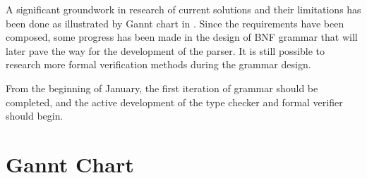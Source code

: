 \documentclass[oneside]{ecsproject}     %
\begin{document}
A significant groundwork in research of current solutions and their limitations has been done as illustrated by Gannt chart in .
Since the requirements have been composed, some progress has been made in the design of BNF grammar that will later pave the way for the development
of the parser. It is still possible to research more formal verification methods during the grammar design.

From the beginning of January, the first iteration of grammar should be completed, and the active development of the type checker and formal verifier should begin.



\appendix

\chapter{Gannt Chart}
\end{document}
